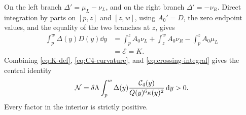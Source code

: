On the left branch \(\Delta'=\mu_L-\nu_L\), and on the right branch
\(\Delta'=-\nu_R\). Direct integration by parts on \([p,z]\) and \([z,w]\),
using \(A_0'=D\), the zero endpoint values, and the equality of the two
branches at \(z\), gives
\begin{align}
 \int_p^w\Delta(y)D(y)\dd y
 &=\int_p^zA_0\nu_L+\int_z^wA_0\nu_R-\int_p^zA_0\mu_L\nonumber\\
 &=\mathcal E=K.\label{eq:crossing-integral}
\end{align}
Combining \eqref{eq:K-def}, \eqref{eq:C4-curvature}, and
\eqref{eq:crossing-integral} gives the central identity
\begin{equation}\label{eq:central-identity}
 \mathcal N=\delta\Lambda\int_p^w
 \Delta(y)\frac{\mathcal{C}_4(y)}{Q(y)^6\kappa(y)^2}\,\mathrm{d} y>0.
\end{equation}
Every factor in the interior is strictly positive.
